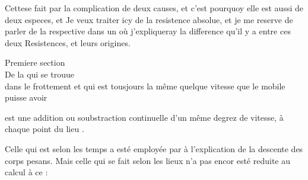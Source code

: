 \pstart
\noindent%
Cettese fait par la complication de deux causes, et c'est pourquoy elle est aussi de deux
especes, et
Je veux traiter icy de la resistence absolue\protect{}, et je me reserve
de parler de la respective\protect{} dans un
o\`{u} j'expliqueray la difference qu'il y a entre ces deux Resistences, et leurs origines.
\pend
\pstart
\vspace{1em} \begin{center} 
Premiere section\\
De la qui se trouue\\dans le frottement et qui est tousjours la m\^{e}me quelque vitesse que le mobile\\puisse avoir
\end{center} \pend
\begin{Geometrico}
\textso{
}est une addition ou soubstraction continuelle
d'un m\^{e}me degrez de vitesse\protect{}, \`{a} chaque point du lieu
.
\end{Geometrico}
\pstart
\noindent%
Celle qui est selon les temps a est\'{e} employ\'{e}e par
\`{a} l'explication de la descente des corps pesans.
Mais celle qui se fait selon les lieux n'a pas encor est\'{e} reduite au calcul \`{a} ce
:
